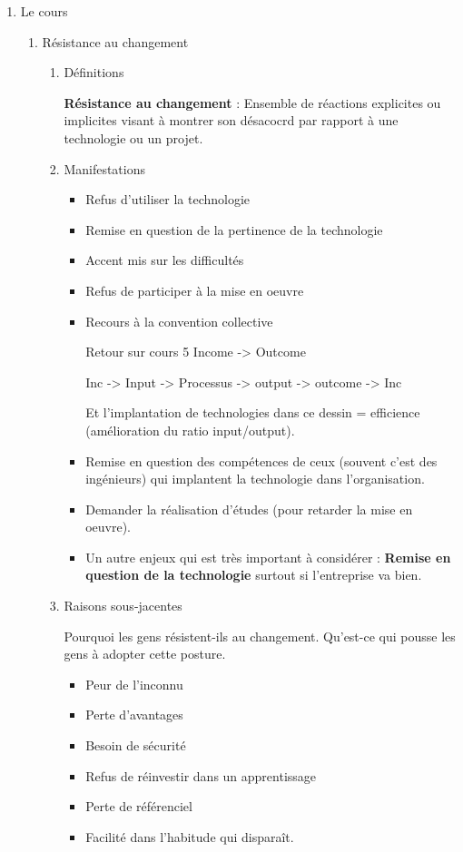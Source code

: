 \documentclass[11pt]{article}
\begin{document}
\begin{enumerate}
\item Le cours
\label{sec:org3df4f59}

\begin{enumerate}
\item Résistance au changement
\label{sec:orgc5aa1fb}
\begin{enumerate}
\item Définitions
\label{sec:orgc88ecdb}

\textbf{Résistance au changement} : Ensemble de réactions explicites ou implicites
visant à montrer son désacocrd par rapport à une technologie ou un projet.

\item Manifestations
\label{sec:org7a27d1b}

\begin{itemize}
\item Refus d'utiliser la technologie
\item Remise en question de la pertinence de la technologie
\item Accent mis sur les difficultés
\item Refus de participer à la mise en oeuvre
\item Recours à la convention collective

Retour sur cours 5 Income -> Outcome

Inc -> Input -> Processus -> output -> outcome -> Inc

Et l'implantation de technologies dans ce dessin = efficience (amélioration du
ratio input/output).
\item Remise en question des compétences de ceux (souvent c'est des ingénieurs) qui
implantent la technologie dans l'organisation.
\item Demander la réalisation d'études (pour retarder la mise en oeuvre).

\item Un autre enjeux qui est très important à considérer : \textbf{Remise en question de
la technologie} surtout si l'entreprise va bien.
\end{itemize}

\item Raisons sous-jacentes
\label{sec:org58055aa}

Pourquoi les gens résistent-ils au changement.  Qu'est-ce qui pousse les gens à
adopter cette posture.

\begin{itemize}
\item Peur de l'inconnu
\item Perte d'avantages
\item Besoin de sécurité
\item Refus de réinvestir dans un apprentissage
\item Perte de référenciel
\item Facilité dans l'habitude qui disparaît.
\end{itemize}


\end{enumerate}
\end{enumerate}
\end{enumerate}
\end{document}
